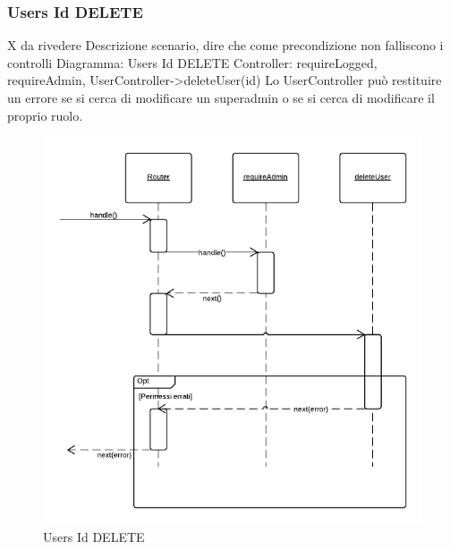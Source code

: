 \subsubsection{Users Id DELETE} X da rivedere
Descrizione scenario, dire che come precondizione non falliscono i controlli
Diagramma: Users Id DELETE
Controller: requireLogged, requireAdmin, UserController->deleteUser(id)
Lo UserController può restituire un errore se si cerca di modificare un superadmin o se si cerca di modificare il proprio ruolo.
\begin{figure}[H]
	\begin{center} 
		\includegraphics[scale=0.60]{scenari/Users Id DELETE.png} 
		\caption{Users Id DELETE}
	\end{center} 
\end{figure}

